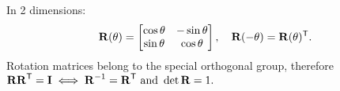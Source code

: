 In 2 dimensions:
\[
	\bm{\mathrm{R}}(\theta) =
	\begin{bmatrix}
		\cos \theta & -\sin \theta \\
		\sin \theta & \cos \theta
	\end{bmatrix},
	\quad
	\bm{\mathrm{R}}(-\theta)
	= \bm{\mathrm{R}}(\theta)^\mathsf{T}
	.
\]
Rotation matrices belong to the special orthogonal group, therefore
\(
	\bm{\mathrm{R}}\bm{\mathrm{R}}^\mathsf{T} = \bm{\mathrm{I}}
	\iff
	\bm{\mathrm{R}}^{-1} = \bm{\mathrm{R}}^\mathsf{T}
	\text{ and }
	\det \bm{\mathrm{R}} = 1.
\)
